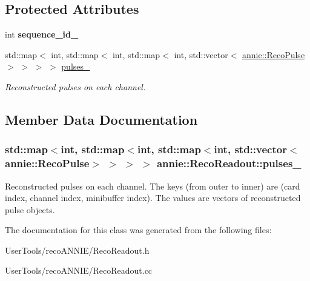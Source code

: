 \subsection*{Protected Attributes}
\begin{DoxyCompactItemize}
\item 
\hypertarget{classannie_1_1RecoReadout_a6ec2ab75a2818cb02152f165fa2cb9ad}{
int {\bfseries sequence\_\-id\_\-}}
\label{classannie_1_1RecoReadout_a6ec2ab75a2818cb02152f165fa2cb9ad}

\item 
std::map$<$ int, std::map$<$ int, std::map$<$ int, std::vector$<$ \hyperlink{classannie_1_1RecoPulse}{annie::RecoPulse} $>$ $>$ $>$ $>$ \hyperlink{classannie_1_1RecoReadout_a17b30b6280a26c5f2a6ae48ae00d6d04}{pulses\_\-}
\begin{DoxyCompactList}\small\item\em Reconstructed pulses on each channel. \item\end{DoxyCompactList}\end{DoxyCompactItemize}


\subsection{Member Data Documentation}
\hypertarget{classannie_1_1RecoReadout_a17b30b6280a26c5f2a6ae48ae00d6d04}{
\subsubsection[{pulses\_\-}]{\setlength{\rightskip}{0pt plus 5cm}std::map$<$int, std::map$<$int, std::map$<$int, std::vector$<${\bf annie::RecoPulse}$>$ $>$ $>$ $>$ {\bf annie::RecoReadout::pulses\_\-}}}
\label{classannie_1_1RecoReadout_a17b30b6280a26c5f2a6ae48ae00d6d04}


Reconstructed pulses on each channel. The keys (from outer to inner) are (card index, channel index, minibuffer index). The values are vectors of reconstructed pulse objects. 

The documentation for this class was generated from the following files:\begin{DoxyCompactItemize}
\item 
UserTools/recoANNIE/RecoReadout.h\item 
UserTools/recoANNIE/RecoReadout.cc\end{DoxyCompactItemize}
